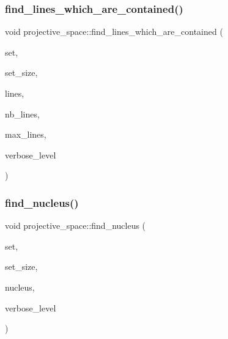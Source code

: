 \mbox{\label{classprojective__space_a4d8db4eb359b80d73170a82b9ebe47ae}} 
\subsubsection{\texorpdfstring{find\+\_\+lines\+\_\+which\+\_\+are\+\_\+contained()}{find\_lines\_which\_are\_contained()}}
{\footnotesize\ttfamily void projective\+\_\+space\+::find\+\_\+lines\+\_\+which\+\_\+are\+\_\+contained (\begin{DoxyParamCaption}\item[{\mbox{\hyperlink{galois_8h_a09fddde158a3a20bd2dcadb609de11dc}{I\+NT}} $\ast$}]{set,  }\item[{\mbox{\hyperlink{galois_8h_a09fddde158a3a20bd2dcadb609de11dc}{I\+NT}}}]{set\+\_\+size,  }\item[{\mbox{\hyperlink{galois_8h_a09fddde158a3a20bd2dcadb609de11dc}{I\+NT}} $\ast$}]{lines,  }\item[{\mbox{\hyperlink{galois_8h_a09fddde158a3a20bd2dcadb609de11dc}{I\+NT}} \&}]{nb\+\_\+lines,  }\item[{\mbox{\hyperlink{galois_8h_a09fddde158a3a20bd2dcadb609de11dc}{I\+NT}}}]{max\+\_\+lines,  }\item[{\mbox{\hyperlink{galois_8h_a09fddde158a3a20bd2dcadb609de11dc}{I\+NT}}}]{verbose\+\_\+level }\end{DoxyParamCaption})}

\mbox{\label{classprojective__space_ab4caadd4ae0323c37cc2f26cfb1194cc}} 
\subsubsection{\texorpdfstring{find\+\_\+nucleus()}{find\_nucleus()}}
{\footnotesize\ttfamily void projective\+\_\+space\+::find\+\_\+nucleus (\begin{DoxyParamCaption}\item[{\mbox{\hyperlink{galois_8h_a09fddde158a3a20bd2dcadb609de11dc}{I\+NT}} $\ast$}]{set,  }\item[{\mbox{\hyperlink{galois_8h_a09fddde158a3a20bd2dcadb609de11dc}{I\+NT}}}]{set\+\_\+size,  }\item[{\mbox{\hyperlink{galois_8h_a09fddde158a3a20bd2dcadb609de11dc}{I\+NT}} \&}]{nucleus,  }\item[{\mbox{\hyperlink{galois_8h_a09fddde158a3a20bd2dcadb609de11dc}{I\+NT}}}]{verbose\+\_\+level }\end{DoxyParamCaption})}

